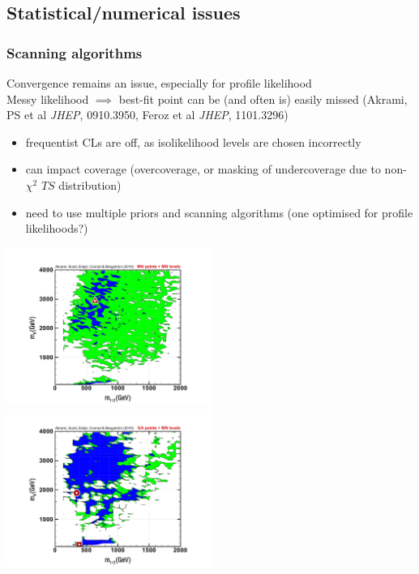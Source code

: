 \documentclass[xcolor=dvipsnames]{beamer}
\newcommand{\cblue}[1]{{\color[rgb]{0.1, 0.0, 0.6} #1}}
\begin{document}
\subsection{Statistical/numerical issues }

\begin{frame}
\frametitle{Scanning algorithms}

\cblue{Convergence remains an issue, especially for profile likelihood}\\
Messy likelihood $\implies$ best-fit point can be (and often is) easily missed {\tiny(Akrami, PS et al {\it JHEP}, 0910.3950, Feroz et al {\it JHEP}, 1101.3296)}
      \begin{itemize}\footnotesize
                 \item frequentist CLs are off, as isolikelihood levels are chosen incorrectly
                 \item can impact coverage (overcoverage, or masking of undercoverage due to non-$\chi^2$ $TS$ distribution)
                 \item need to use multiple priors and scanning algorithms (one optimised for profile likelihoods?)  
      \end{itemize}\vspace{-2mm}
\includegraphics[width=0.5\textwidth]{MN_m0mhf_MNlevels}	
\includegraphics[width=0.5\textwidth]{GA_m0mhf_MNlevels}	


\end{frame}
\end{document}

